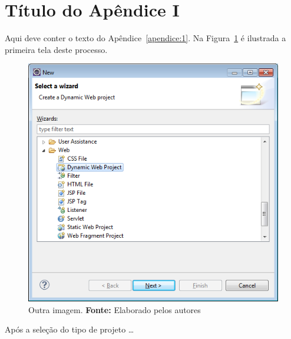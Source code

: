 \chapter*{Título do Apêndice I}
\label{apendice:1}

\par Aqui deve conter o texto do Apêndice~\ref{apendice:1}. Na Figura~\ref{fig:ap1:identificador} é ilustrada a primeira tela deste processo.
\captionsetup[figure]{list=no}
\begin{figure}[h!]
 \centerline{\includegraphics[scale=0.5]{./imagens/apendice_img1.png}}
 \caption[Outra imagem.]
           {Outra imagem. \textbf{Fonte:} Elaborado pelos autores}
  \label{fig:ap1:identificador}
\end{figure}

\par Após a seleção do tipo de projeto \ldots